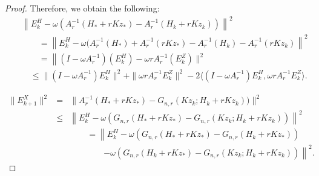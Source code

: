 \begin{itemize}
\begin{proof}
Therefore, we obtain the following: 
\begin{eqnarray*}
&& \left \|E_k^H - \omega (A_r^{-1}(H_*+rKz_*) - A_{r}^{-1} (H_k+rKz_k)) \right \|^2 \\
&& \qquad =  \left \|E_k^H - \omega (A_{r}^{-1}(H_*) + A_r^{-1}(rKz_*) - A_r^{-1}(H_k) - A_r^{-1}(rKz_k) \right \|^2 \\
&& \qquad = \left \|(I - \omega A_{r}^{-1})(E_k^H) - \omega r A_r^{-1} (E_k^Z) \right. \|^2 \\
&& \quad  \leq \|(I - \omega A_r^{-1}) E_k^H \|^2 + \|\omega r A_r^{-1} E_k^Z\|^2 - 2 \langle(I - \omega A_r^{-1}) E_k^H, \omega r A_r^{-1} E_k^Z \rangle. 
\end{eqnarray*}


\begin{eqnarray*}
\|E_{k+1}^X\|^2 &=& \|A_{r}^{-1}(H_*+rKz_*) - G_{n,r} (Kz_k; H_k+rKz_k))\|^2 \\
 &\leq&  \left \|E_k^H - \omega (G_{n,r}(H_*+rKz_*) - G_{n,r} (Kz_k; H_k+rKz_k)) \right \|^2 \\
&& \qquad = \left \|E_k^H - \omega (G_{n,r}(H_*+rKz_*) - G_{n,r}( H_k+rKz_*)) \right. \\
&& \qquad\qquad \left. - \omega (G_{n,r}(H_k+rKz_*) - G_{n,r}(Kz_k;H_k+rKz_k)) \right \|^2. 
\end{eqnarray*}


\end{proof}
\end{itemize}
